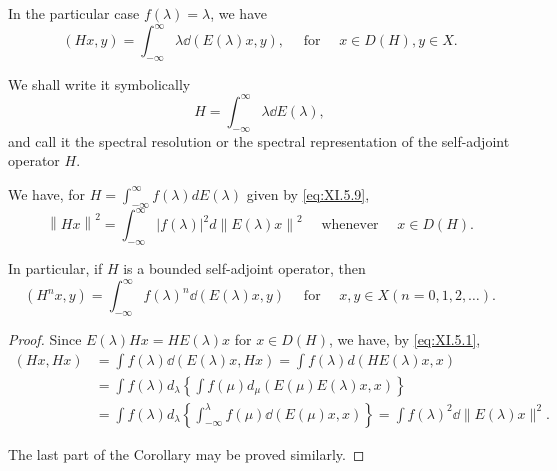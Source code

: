 \begin{corollary}\label{cor:XI.5.Corollary.1} In the particular case $f(\lambda) = \lambda$, we have 
\begin{equation}\label{eq:XI.5.10}
(H x, y) = \int_{- \infty} ^{\infty} \lambda \dd (E (\lambda) x, y), \quad \text{ for } \quad x \in D (H), y \in X.
\end{equation}
\end{corollary}

We shall write it symbolically 
\[
H = \int_{- \infty} ^{\infty} \lambda \dd E (\lambda),
\]
and call it the spectral resolution or the spectral representation of the self-adjoint operator $H$. 

\begin{corollary}\label{cor:XI.5.Corollary.2} We have, for $H = \int_{-\infty}^{\infty} f(\lambda) dE(\lambda)$ given by \eqref{eq:XI.5.9}, 
\begin{equation}\label{eq:XI.5.11}
\left\| H x \right\| ^{2} = \int_{- \infty} ^{\infty} | f (\lambda) | ^{2} d \left\| E (\lambda) x \right\| ^{2} \quad \text{ whenever } \quad x \in D (H).
\end{equation}
\end{corollary}

In particular, if $H$ is a bounded self-adjoint operator, then 
\begin{equation}\label{eq:XI.5.12}
(H ^{n} x, y) = \int_{- \infty} ^{\infty} f (\lambda) ^{n} \dd (E (\lambda) x, y) \quad \text{ for } \quad x, y \in X (n = 0, 1, 2, \dots).
\end{equation}

\begin{proof}
 Since $E(\lambda) Hx = HE(\lambda)x$ for $x \in D(H)$, we have, by \eqref{eq:XI.5.1}, 
\[ \begin{aligned} (H x, H x) & = \int f (\lambda) \dd (E (\lambda) x, H x) = \int f (\lambda) d (H E (\lambda) x, x) \\ & = \int f (\lambda) d _{\lambda} \left\{\int f (\mu) d _{\mu} (E (\mu) E (\lambda) x, x) \right\} \\ & = \int f (\lambda) d _{\lambda} \left\{\int_{- \infty} ^{\lambda} f (\mu) \dd (E (\mu) x, x) \right\} = \int f (\lambda) ^{2} \dd \| E (\lambda) x \| ^{2}. \end{aligned}
\]


The last part of the Corollary may be proved similarly.
\end{proof}

